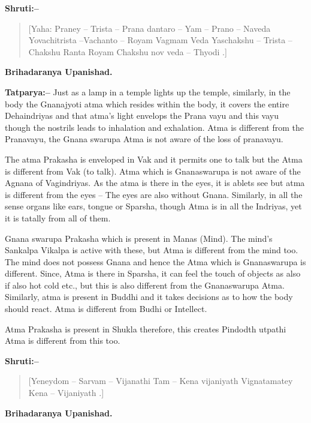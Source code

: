\textbf{Shruti:–}

\begin{verse}
[Yaha: Praney – Trista – Prana dantaro – Yam – Prano – Naveda  Yovachitrista –Vachanto – Royam Vagmam Veda  Yaschakshu – Trista – Chakshu Ranta Royam Chakshu nov veda – Thyodi .]
\end{verse}

\begin{flushright}
\textbf{Brihadaranya Upanishad.}
\end{flushright}

\textbf{Tatparya:–} Just as a lamp in a temple lights up the temple, similarly, in the body the Gnanajyoti atma which resides within the body, it covers the entire Dehaindriyas and that atma's light envelops the Prana vayu and this vayu though the nostrils leads to inhalation and exhalation. Atma is different from the Pranavayu, the Gnana swarupa Atma is not aware of the loss of pranavayu.

The atma Prakasha is enveloped in Vak and it permits one to talk but the Atma is different from Vak (to talk). Atma which is Gnanaswarupa is not aware of the Agnana of Vagindriyas. As the atma is there in the eyes, it is ablets see but atma is different from the eyes – The eyes are also without Gnana. Similarly, in all the sense organs like ears, tongue or Sparsha, though Atma is in all the Indriyas, yet it is tatally from all of them.

Gnana swarupa Prakasha which is present in Manas (Mind). The mind's Sankalpa Vikalpa is active with these, but Atma is different from the mind too. The mind does not possess Gnana and hence the Atma which is Gnanaswarupa is different. Since, Atma is there in Sparsha, it can feel the touch of objects as also if also hot cold etc., but this is also different from the Gnanaswarupa Atma. Similarly, atma is present in Buddhi and it takes decisions as to how the body should react. Atma is different from Budhi or Intellect.

Atma Prakasha is present in Shukla therefore, this creates Pindodth utpathi Atma is different from this too.

\textbf{Shruti:–}

\begin{verse}
[Yeneydom – Sarvam – Vijanathi Tam – Kena vijaniyath  Vignatamatey Kena – Vijaniyath .]
\end{verse}

\begin{flushright}
\textbf{Brihadaranya Upanishad.}
\end{flushright}

